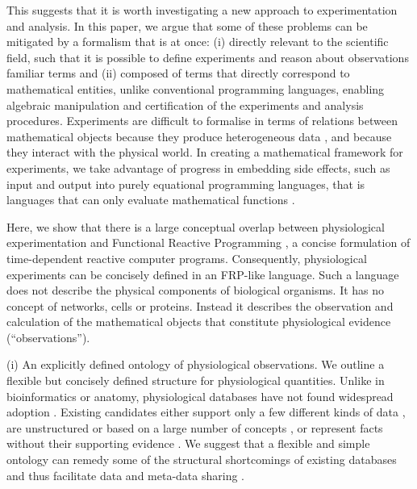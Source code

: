 This suggests that it is worth investigating a new approach to
experimentation and analysis.  In this paper, we argue that some of
these problems can be mitigated by a formalism that is at once: (i)
directly relevant to the scientific field, such that it is possible to
define experiments and reason about observations familiar terms and
(ii) composed of terms that directly correspond to mathematical
entities, unlike conventional programming languages, enabling
algebraic manipulation and certification of the experiments and
analysis procedures. Experiments are difficult to formalise in terms
of relations between mathematical objects because they produce
heterogeneous data \citep{Tukey1962}, and because they interact with
the physical world. In creating a mathematical framework for
experiments, we take advantage of progress in embedding side effects,
such as input and output \citep{PeytonJones2002, Roy2004, Wadler1995}
into purely equational programming languages, that is languages that
can only evaluate mathematical functions \citep{Church1941}. 

Here, we show that there is a large conceptual overlap between
physiological experimentation and Functional Reactive Programming
\citep[FRP;][]{Elliott1997, Nilsson2002}, a concise formulation of
time-dependent reactive computer programs. Consequently, physiological
experiments can be concisely defined in an FRP-like language. Such a
language does not describe the physical components of biological
organisms. It has no concept of networks, cells or proteins. Instead
it describes the observation and calculation of the mathematical
objects that constitute physiological evidence (``observations'').

(i) An explicitly defined ontology of physiological observations. We
outline a flexible but concisely defined structure for physiological
quantities.  Unlike in bioinformatics or anatomy, physiological
databases have not found widespread adoption \citep{Herz2008,
  Amari2002}. Existing candidates either support only a few different
kinds of data \citep{Jessop2010}, are unstructured \citep{Teeters2008}
or based on a large number of concepts \citep{Frishkoff2009}, or
represent facts without their supporting evidence \citep{Katz2010}.
We suggest that a flexible and simple ontology
can remedy some of the structural shortcomings of existing databases
\citep{Gardner2005, Amari2002} and thus facilitate data and meta-data
sharing \citep{Insel2003}.

